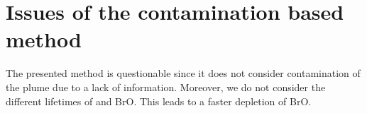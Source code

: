 \documentclass  [
  paper    = a4,
  BCOR     = 10mm,
  twoside,
  fontsize = 12pt,
  fleqn,
  toc      = bibnumbered,
  toc      = listofnumbered,
  numbers  = noendperiod,
  headings = normal,
  listof   = leveldown,
  version  = 3.03
]                                       {scrreprt}
\begin{document}
%
%
\FloatBarrier
	\section{Issues of the contamination based method}
	The presented method is questionable since it does not consider contamination of the plume due to a lack of information. Moreover, we do not consider the different lifetimes of  and BrO. This leads to a faster depletion of BrO.
	
\end{document}
